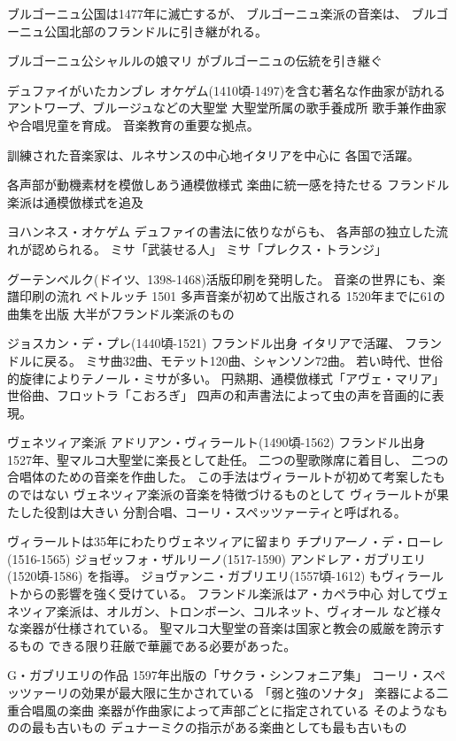 \documentclass[a4j]{jarticle}
\begin{document}
ブルゴーニュ公国は1477年に滅亡するが、
ブルゴーニュ楽派の音楽は、
ブルゴーニュ公国北部のフランドルに引き継がれる。

ブルゴーニュ公シャルルの娘マリ
がブルゴーニュの伝統を引き継ぐ

デュファイがいたカンブレ
オケゲム(1410頃-1497)を含む著名な作曲家が訪れる
アントワープ、ブルージュなどの大聖堂
大聖堂所属の歌手養成所
歌手兼作曲家や合唱児童を育成。
音楽教育の重要な拠点。

訓練された音楽家は、ルネサンスの中心地イタリアを中心に
各国で活躍。

各声部が動機素材を模倣しあう通模倣様式
楽曲に統一感を持たせる
フランドル楽派は通模倣様式を追及

ヨハンネス・オケゲム
デュファイの書法に依りながらも、
各声部の独立した流れが認められる。
ミサ「武装せる人」
ミサ「プレクス・トランジ」

グーテンベルク(ドイツ、1398-1468)活版印刷を発明した。
音楽の世界にも、楽譜印刷の流れ
ペトルッチ
1501 多声音楽が初めて出版される
1520年までに61の曲集を出版
大半がフランドル楽派のもの

ジョスカン・デ・プレ(1440頃-1521)
フランドル出身
イタリアで活躍、
フランドルに戻る。
ミサ曲32曲、モテット120曲、シャンソン72曲。
若い時代、世俗的旋律によりテノール・ミサが多い。
円熟期、通模倣様式「アヴェ・マリア」
世俗曲、フロットラ「こおろぎ」
四声の和声書法によって虫の声を音画的に表現。

ヴェネツィア楽派
アドリアン・ヴィラールト(1490頃-1562)
フランドル出身
1527年、聖マルコ大聖堂に楽長として赴任。
二つの聖歌隊席に着目し、
二つの合唱体のための音楽を作曲した。
この手法はヴィラールトが初めて考案したものではない
ヴェネツィア楽派の音楽を特徴づけるものとして
ヴィラールトが果たした役割は大きい
分割合唱、コーリ・スペッツァーティと呼ばれる。

ヴィラールトは35年にわたりヴェネツィアに留まり
チプリアーノ・デ・ローレ(1516-1565)
ジョゼッフォ・ザルリーノ(1517-1590)
アンドレア・ガブリエリ(1520頃-1586)
を指導。
ジョヴァンニ・ガブリエリ(1557頃-1612)
もヴィラールトからの影響を強く受けている。
フランドル楽派はア・カペラ中心
対してヴェネツィア楽派は、オルガン、トロンボーン、コルネット、ヴィオール
など様々な楽器が仕様されている。
聖マルコ大聖堂の音楽は国家と教会の威厳を誇示するもの
できる限り荘厳で華麗である必要があった。

G・ガブリエリの作品
1597年出版の「サクラ・シンフォニア集」
コーリ・スペッツァーリの効果が最大限に生かされている
「弱と強のソナタ」
楽器による二重合唱風の楽曲
楽器が作曲家によって声部ごとに指定されている
そのようなものの最も古いもの
デュナーミクの指示がある楽曲としても最も古いもの
\end{document}
